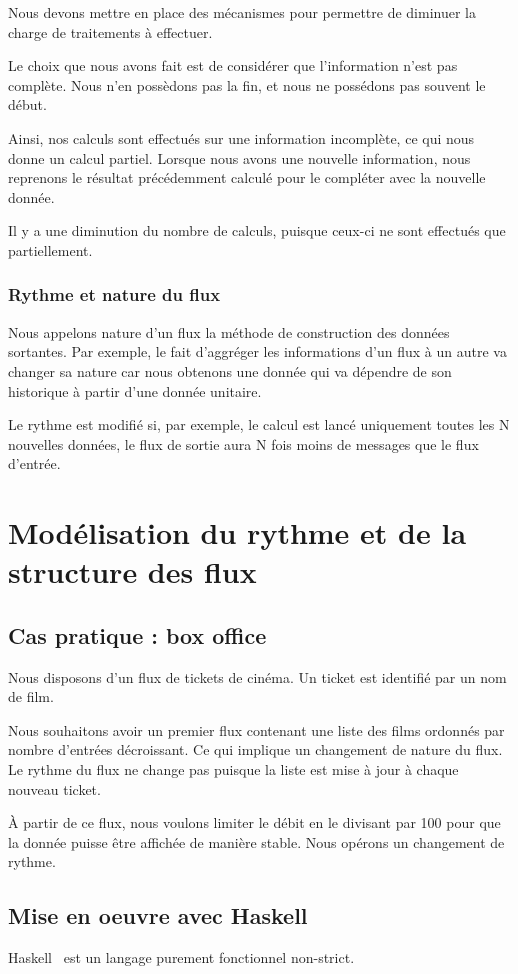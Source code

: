 \documentclass{llncs}
\begin{document}
Nous devons mettre en place des mécanismes pour permettre de diminuer la charge
de traitements à effectuer.

Le choix que nous avons fait est de considérer que l'information n'est pas complète.
Nous n'en possèdons pas la fin, et nous ne possédons pas souvent le début.

Ainsi, nos calculs sont effectués sur une information incomplète, ce qui nous
donne un calcul partiel.
Lorsque nous avons une nouvelle information, nous reprenons le résultat
précédemment calculé pour le compléter avec la nouvelle donnée.

Il y a une diminution du nombre de calculs, puisque ceux-ci ne sont effectués
que partiellement.

\subsubsection{Rythme et nature du flux}
Nous appelons nature d'un flux la méthode de construction des données sortantes.
Par exemple, le fait d'aggréger les informations d'un flux à un autre va changer
sa nature car nous obtenons une donnée qui va dépendre de son historique
à partir d'une donnée unitaire.

Le rythme est modifié si, par exemple, le calcul est lancé uniquement toutes les
N nouvelles données, le flux de sortie aura N fois moins de messages que le flux d'entrée.

\section{Modélisation du rythme et de la structure des flux}
\subsection{Cas pratique : box office}
Nous disposons d'un flux de tickets de cinéma.
Un ticket est identifié par un nom de film.

Nous souhaitons avoir un premier flux contenant une liste des films ordonnés par
nombre d'entrées décroissant.
Ce qui implique un changement de nature du flux.
Le rythme du flux ne change pas puisque la liste est mise à jour à chaque nouveau
ticket.

À partir de ce flux, nous voulons limiter le débit en le divisant par 100 pour
que la donnée puisse être affichée de manière stable.
Nous opérons un changement de rythme.

\subsection{Mise en oeuvre avec Haskell}
Haskell~\cite{Haskell10} est un langage purement fonctionnel non-strict.
\end{document}
